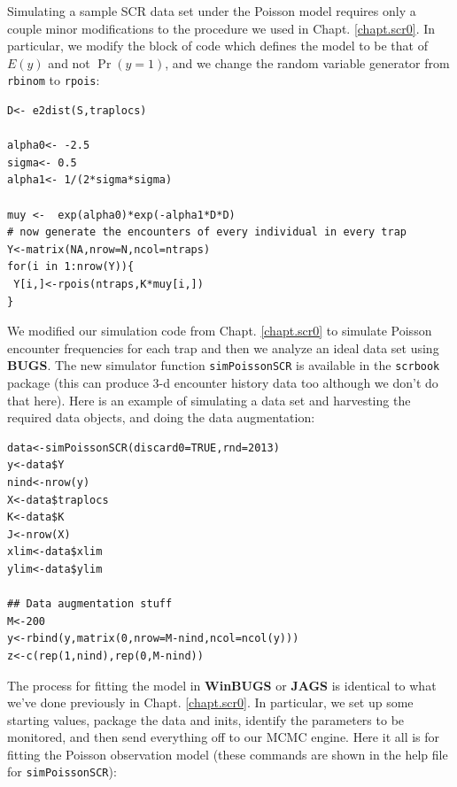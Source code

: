 Simulating a sample SCR data set under the Poisson model requires only
a couple minor modifications to the procedure we used in
Chapt. \ref{chapt.scr0}. In particular, we modify the block of code
which defines the model to be that of $E(y)$ and not $\Pr(y=1)$, and
we change the random variable generator from \mbox{\tt rbinom} to
\mbox{\tt rpois}:
{\small
\begin{verbatim}
D<- e2dist(S,traplocs)

alpha0<- -2.5
sigma<- 0.5
alpha1<- 1/(2*sigma*sigma)

muy <-  exp(alpha0)*exp(-alpha1*D*D)
# now generate the encounters of every individual in every trap
Y<-matrix(NA,nrow=N,ncol=ntraps)
for(i in 1:nrow(Y)){
 Y[i,]<-rpois(ntraps,K*muy[i,])
}
\end{verbatim}
}

We modified our simulation code from Chapt. \ref{chapt.scr0} to
simulate Poisson encounter frequencies for each trap and then we
analyze an ideal data set using {\bf BUGS}. The new simulator function
{\tt  simPoissonSCR} is
available in the \mbox{\tt scrbook} package (this can produce 3-d encounter history
data too although we don't do that here).  Here is an example of
simulating a data set and harvesting the required data objects, and
doing the data augmentation:

{\small
\begin{verbatim}
data<-simPoissonSCR(discard0=TRUE,rnd=2013)
y<-data$Y
nind<-nrow(y)
X<-data$traplocs
K<-data$K
J<-nrow(X)
xlim<-data$xlim
ylim<-data$ylim

## Data augmentation stuff
M<-200
y<-rbind(y,matrix(0,nrow=M-nind,ncol=ncol(y)))
z<-c(rep(1,nind),rep(0,M-nind))
\end{verbatim}
}

The process for fitting
the model in {\bf WinBUGS} or {\bf JAGS} is identical to what we've done
previously in Chapt. \ref{chapt.scr0}. In particular, we set up some
starting values, package the data and inits, identify the parameters
to be monitored, and then send everything off to our MCMC engine. Here
it all is for fitting the Poisson observation model (these commands
are shown in the help file for \mbox{\tt simPoissonSCR}):

